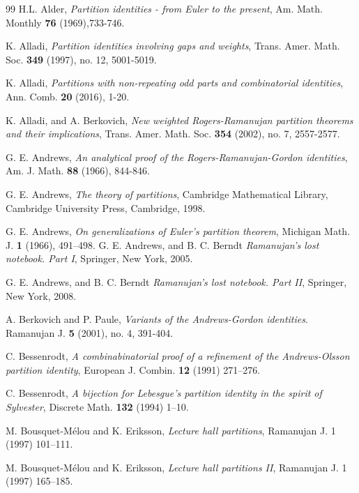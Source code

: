 \documentclass[draft]{amsart}
\numberwithin{equation}{section}
\theoremstyle{plain}
\theoremstyle{remark}
\begin{document}
\begin{thebibliography}{99}
 H.L. Alder, \textit{Partition identities - from Euler to the present}, Am. Math. Monthly  \textbf{76} (1969),733-746.

 K. Alladi, \textit{Partition identities involving gaps and weights}, Trans. Amer. Math. Soc. \textbf{349} (1997), no. 12, 5001-5019.

 K. Alladi, \textit{Partitions with non-repeating odd parts and combinatorial identities}, Ann. Comb. \textbf{20} (2016), 1-20.

 K. Alladi, and A. Berkovich, \textit{New weighted Rogers-Ramanujan partition theorems and their implications}, Trans. Amer. Math. Soc. \textbf{354} (2002), no. 7, 2557-2577.

 G. E. Andrews, \textit{An analytical proof of the Rogers-Ramanujan-Gordon identities}, Am. J. Math. \textbf{88} (1966),  844-846.    

 G. E. Andrews, \textit{The theory of partitions}, Cambridge Mathematical Library, Cambridge University Press, Cambridge, 1998. 

 G. E. Andrews, \textit{On generalizations of Euler's partition theorem}, Michigan Math. J. \textbf{1}
 (1966), 491--498.
 G. E. Andrews, and B. C. Berndt \textit{Ramanujan's lost notebook. Part I}, Springer, New York, 2005. 

 G. E. Andrews, and B. C. Berndt \textit{Ramanujan's lost notebook. Part II}, Springer, New York, 2008. 


A. Berkovich and P. Paule, \textit{Variants of the Andrews-Gordon identities}. Ramanujan J. \textbf{5} (2001), no. 4, 391-404.

 C. Bessenrodt, \textit{A combinabinatorial proof of a refinement of
the Andrews-Olsson partition identity}, European J. Combin.  \textbf{12} (1991) 271--276.

 C. Bessenrodt, \textit{A bijection for Lebesgue's partition
identity in the spirit of Sylvester}, Discrete Math.  \textbf{132} (1994) 1--10.

M. Bousquet-M\'{e}lou and K. Eriksson,
\textit{Lecture hall partitions}, Ramanujan J.  1 (1997) 101--111.

M. Bousquet-M\'{e}lou and K. Eriksson,
\textit{Lecture hall partitions II}, Ramanujan J.  1 (1997) 165--185.




\end{thebibliography}
\end{document}
